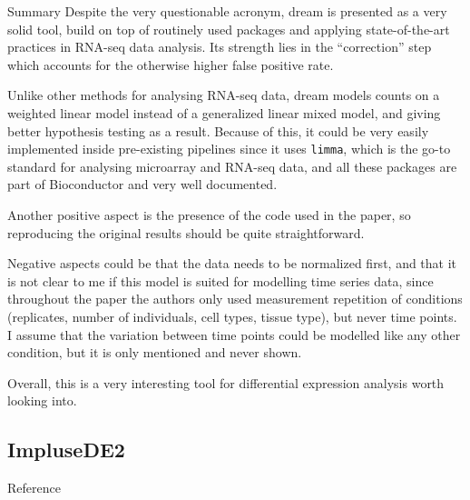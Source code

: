 \documentclass[10pt,a4paper]{article}
\newlength{\templength}
\newenvironment{ann_section}[1]
{\settowidth{\templength}{#1}%
\noindent\textbf{#1}
\hspace{1em}\begin{minipage}[t]{\dimexpr \linewidth-\the\templength-2em}}
{\end{minipage}\par\bigskip}
\begin{document}
\begin{ann_section}{Summary}
Despite the very questionable acronym, dream is presented as a very solid tool, build on top of routinely used packages and applying state-of-the-art practices in RNA-seq data analysis. Its strength lies in the ``correction'' step which accounts for the otherwise higher false positive rate.

Unlike other methods for analysing RNA-seq data, dream models counts on a weighted linear model instead of a generalized linear mixed model, and giving better hypothesis testing as a result. Because of this, it could be very easily implemented inside pre-existing pipelines since it uses \texttt{limma}, which is the go-to standard for analysing microarray and RNA-seq data, and all these packages are part of Bioconductor and very well documented.

Another positive aspect is the presence of the code used in the paper, so reproducing the original results should be quite straightforward.

Negative aspects could be that the data needs to be normalized first, and that it is not clear to me if this model is suited for modelling time series data, since throughout the paper the authors only used measurement repetition of conditions (replicates, number of individuals, cell types, tissue type), but never time points. I assume that the variation between time points could be modelled like any other condition, but it is only mentioned and never shown.

Overall, this is a very interesting tool for differential expression analysis worth looking into.
\end{ann_section}

\subsection{ImpluseDE2}
\begin{ann_section}{Reference}
\mbox{}
\end{ann_section}
\end{document}
